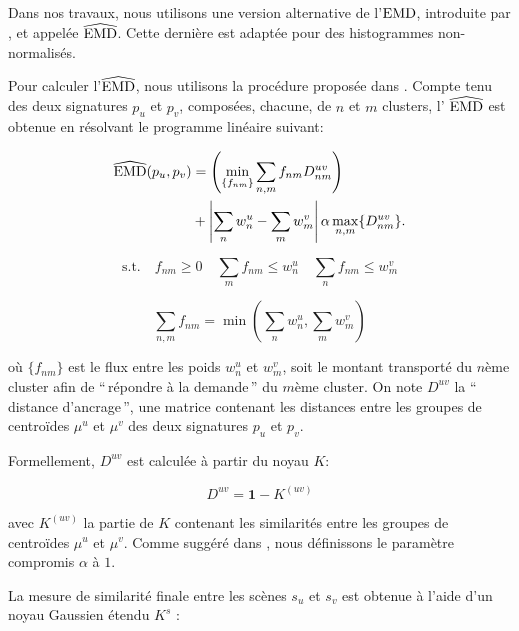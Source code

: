 Dans nos travaux, nous utilisons une version alternative de l'$\mathrm{EMD}$, introduite par \citep{pele2008linear}, et appelée $\widehat{\mathrm{EMD}}$. Cette dernière est adaptée pour des histogrammes non-normalisés.

Pour calculer l'$\widehat{\mathrm{EMD}}$, nous utilisons la procédure proposée dans \citep{pele2009fast}. Compte tenu des deux signatures $p_u$ et $p_v$, composées, chacune, de $n$ et $m$ clusters, l' $\widehat{\mathrm{EMD}}$ est obtenue en résolvant le programme linéaire suivant:

\begin{equation}
\begin{split}
\widehat{\mathrm{EMD}}(p_u,p_v) &=\left( \min\limits_{\lbrace f_{nm}\rbrace} \sum\limits_{n,m} f_{nm}D_{nm}^{uv} \right) \\
&+ \left|\sum\limits_{n} w_n^u - \sum\limits_{m} w_m^v  \right| \alpha \max\limits_{n,m}\lbrace  D_{nm}^{uv}\rbrace.
\end{split}
\end{equation}

\begin{equation*}
\mathrm{s.t.} \quad f_{nm}\geq0 \quad \sum\limits_{m} f_{nm} \leq w_n^u \quad \sum\limits_{n} f_{nm} \leq w_m^v
\end{equation*}

\begin{equation*}
\sum\limits_{n,m}f_{nm} = \min\left( \sum\limits_{n} w_n^u ,\sum\limits_{m} w_m^v \right)
\end{equation*} 

où  $\lbrace f_{nm} \rbrace$ est le flux entre les poids $w_n^u$ et $w_m^v$, soit le montant transporté du $n$ème cluster afin de  ``\,répondre à la demande\,'' du $m$ème cluster. On note $D^{uv}$ la ``\,distance d'ancrage\,'', une matrice contenant les distances entre les groupes de centroïdes  $\mu^u$ et $\mu^v$ des deux signatures $p_u$ et $p_v$. 

Formellement, $D^{uv}$ est calculée à partir du noyau $K$:

\begin{equation}
D^{uv}=\boldsymbol{1}-K^{(uv)}
\end{equation}

avec $K^{(uv)}$ la partie de $K$ contenant les similarités entre les groupes de centroïdes $\mu^u$ et $\mu^v$. Comme suggéré dans \citep{pele2009fast}, nous définissons le paramètre compromis $\alpha$ à $1$.

La mesure de similarité finale entre les scènes $s_u$ et $s_v$ est obtenue à l'aide d'un noyau Gaussien étendu $K^s$  \citep{chapelle1999support,jing2003support}:

